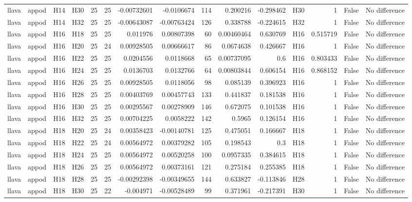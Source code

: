 \begin{longtable}{llllrrrrrrrlrrl}
llava & appod & H14 & H30 & 25 & 25 & -0.00732601 & -0.0106674 & 114 & 0.200216 & -0.298462 & H30 & 1 & False & No difference \\
llava & appod & H14 & H32 & 25 & 25 & -0.00643087 & -0.00763424 & 126 & 0.338788 & -0.224615 & H32 & 1 & False & No difference \\
llava & appod & H16 & H18 & 25 & 25 & 0.011976 & 0.00807398 & 60 & 0.00460464 & 0.630769 & H16 & 0.515719 & False & No difference \\
llava & appod & H16 & H20 & 25 & 24 & 0.00928505 & 0.00666617 & 86 & 0.0674638 & 0.426667 & H16 & 1 & False & No difference \\
llava & appod & H16 & H22 & 25 & 25 & 0.0204556 & 0.0118668 & 65 & 0.00737095 & 0.6 & H16 & 0.803433 & False & No difference \\
llava & appod & H16 & H24 & 25 & 25 & 0.0136703 & 0.0132766 & 64 & 0.00803844 & 0.606154 & H16 & 0.868152 & False & No difference \\
llava & appod & H16 & H26 & 25 & 25 & 0.00928505 & 0.0118056 & 98 & 0.085139 & 0.396923 & H16 & 1 & False & No difference \\
llava & appod & H16 & H28 & 25 & 25 & 0.00403769 & 0.00457743 & 133 & 0.441837 & 0.181538 & H16 & 1 & False & No difference \\
llava & appod & H16 & H30 & 25 & 25 & 0.00295567 & 0.00278909 & 146 & 0.672075 & 0.101538 & H16 & 1 & False & No difference \\
llava & appod & H16 & H32 & 25 & 25 & 0.00704225 & 0.0058222 & 142 & 0.5965 & 0.126154 & H16 & 1 & False & No difference \\
llava & appod & H18 & H20 & 25 & 24 & 0.00358423 & -0.00140781 & 125 & 0.475051 & 0.166667 & H18 & 1 & False & No difference \\
llava & appod & H18 & H22 & 25 & 24 & 0.00564972 & 0.00379282 & 105 & 0.198543 & 0.3 & H18 & 1 & False & No difference \\
llava & appod & H18 & H24 & 25 & 25 & 0.00564972 & 0.00520258 & 100 & 0.0957335 & 0.384615 & H18 & 1 & False & No difference \\
llava & appod & H18 & H26 & 25 & 25 & 0.00564972 & 0.00373161 & 121 & 0.275184 & 0.255385 & H18 & 1 & False & No difference \\
llava & appod & H18 & H28 & 25 & 25 & -0.00292398 & -0.00349655 & 144 & 0.633827 & -0.113846 & H28 & 1 & False & No difference \\
llava & appod & H18 & H30 & 25 & 22 & -0.004971 & -0.00528489 & 99 & 0.371961 & -0.217391 & H30 & 1 & False & No difference \\

\end{longtable}
